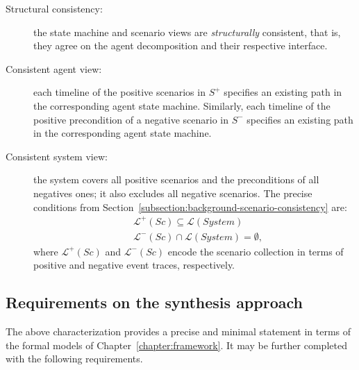 \begin{description}
\item[Structural consistency:] the state machine and scenario views are \emph{structurally} consistent, that is, they agree on the agent decomposition and their respective interface.

\item[Consistent agent view:] each timeline of the positive scenarios in $S^+$ specifies an existing path in the corresponding agent state machine. Similarly, each timeline of the positive precondition of a negative scenario in $S^-$ specifies an existing path in the corresponding agent state machine. 

\item[Consistent system view:] the system covers all positive scenarios and the preconditions of all negatives ones; it also excludes all negative scenarios. The precise conditions from Section~\ref{subsection:background-scenario-consistency} are:
\begin{align}
&\mathcal{L}^+(Sc) \subseteq \mathcal{L}(System)         \label{relation:inductive-statement-positive}\\
&\mathcal{L}^-(Sc) \cap \mathcal{L}(System) = \emptyset, \label{relation:inductive-statement-negative}
\end{align}
where $\mathcal{L}^+(Sc)$ and $\mathcal{L}^-(Sc)$ encode the scenario collection in terms of positive and negative event traces, respectively.

\end{description}


\subsection{Requirements on the synthesis approach\label{subsection:inductive-synthesis-requirements}}

The above characterization provides a precise and minimal statement in terms of the formal models of Chapter~\ref{chapter:framework}. It may be further completed with the following requirements.

